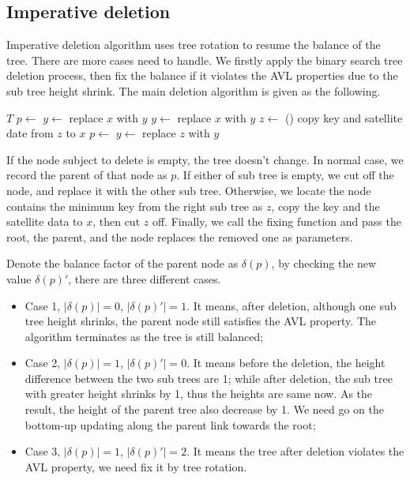 \documentclass[UTF8]{article}
\begin{document}
\subsection{Imperative deletion}

Imperative deletion algorithm uses tree rotation to resume the balance of the tree.
There are more cases need to handle. We firstly apply the binary search tree deletion
process, then fix the balance if it violates the AVL properties due to the sub tree
height shrink. The main deletion algorithm is given as the following.

\begin{algorithmic}[1]
    \State \Return $T$
  \EndIf
  \State $p \gets$ 
    \State $y \gets $ 
    \State replace $x$ with $y$
    \State $y \gets $ 
    \State replace $x$ with $y$
  \Else
    \State $z \gets$ ()
    \State copy key and satellite date from $z$ to $x$
    \State $p \gets$ 
    \State $y \gets$ 
    \State replace $z$ with $y$
  \EndIf
  \State \Return {}
\EndFunction
\end{algorithmic}

If the node subject to delete is empty, the tree doesn't change. In normal case,
we record the parent of that node as $p$. If either of sub tree is empty, we
cut off the node, and replace it with the other sub tree. Otherwise, we locate
the node contains the minimum key from the right sub tree as $z$, copy the key and the
satellite data to $x$, then cut $z$ off. Finally, we call the fixing function
and pass the root, the parent, and the node replaces the removed one as parameters.

Denote the balance factor of the parent node as $\delta(p)$, by checking the new value
$\delta(p)'$, there are three different cases.

\begin{itemize}
\item Case 1, $|\delta(p)| = 0$, $|\delta(p)'| = 1$. It means, after deletion,
although one sub tree height shrinks, the parent node still satisfies the AVL
property. The algorithm terminates as the tree is still balanced;
\item Case 2, $|\delta(p)| = 1$, $|\delta(p)'| = 0$. It means before the deletion,
the height difference between the two sub trees are 1; while after deletion, the
sub tree with greater height shrinks by 1, thus the heights are same now. As the
result, the height of the parent tree also decrease by 1. We need go on the
bottom-up updating along the parent link towards the root;
\item Case 3, $|\delta(p)| = 1$, $|\delta(p)'| = 2$. It means the tree after deletion
violates the AVL property, we need fix it by tree rotation.
\end{itemize}
\end{document}

